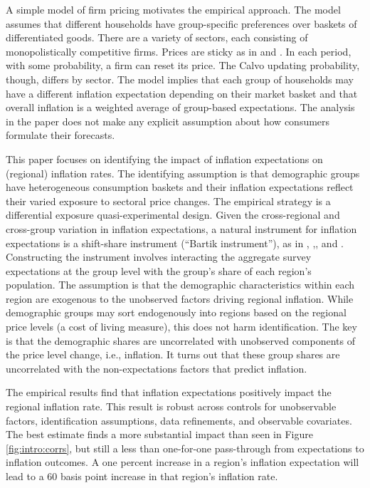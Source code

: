 \documentclass[12pt]{article}
\begin{document}
A simple model of firm pricing motivates the empirical approach. The model assumes that different households have group-specific preferences over baskets of differentiated goods. There are a variety of sectors, each consisting of monopolistically competitive firms. Prices are sticky as in \cite{Calvo:JMoE1983} and \cite{WoodfordBook}. In each period, with some probability, a firm can reset its price. The Calvo updating probability, though, differs by sector. The model implies that each group of households may have a different inflation expectation depending on their market basket and that overall inflation is a weighted average of group-based expectations. The analysis in the paper does not make any explicit assumption about how consumers formulate their forecasts.

This paper focuses on identifying the impact of inflation expectations on (regional) inflation rates. The identifying assumption is that demographic groups have heterogeneous consumption baskets and their inflation expectations reflect their varied exposure to sectoral price changes. The empirical strategy is a differential exposure quasi-experimental design. Given the cross-regional and cross-group variation in inflation expectations, a natural instrument for inflation expectations is a shift-share instrument (``Bartik instrument''), as in \cite{Bartik:1991}, \cite{BlanchardKatz},\cite{Almas:AER2012}, and \cite{Pinkhametal:AER2020}. Constructing the instrument involves interacting the aggregate survey expectations at the group level with the group's share of each region's population. The assumption is that the demographic characteristics within each region are exogenous to the unobserved factors driving regional inflation. While demographic groups may sort endogenously into regions based on the regional price levels (a cost of living measure), this does not harm identification. The key is that the demographic shares are uncorrelated with unobserved components of the price level change, i.e., inflation. It turns out that these group shares are uncorrelated with the non-expectations factors that predict inflation.  

The empirical results find that inflation expectations positively impact the regional inflation rate. This result is robust across controls for unobservable factors, identification assumptions, data refinements, and observable covariates. The best estimate finds a more substantial impact than seen in Figure \ref{fig:intro:corrs}, but still a less than one-for-one pass-through from expectations to inflation outcomes. A one percent increase in a region's inflation expectation will lead to a 60 basis point increase in that region's inflation rate.  
\end{document}
